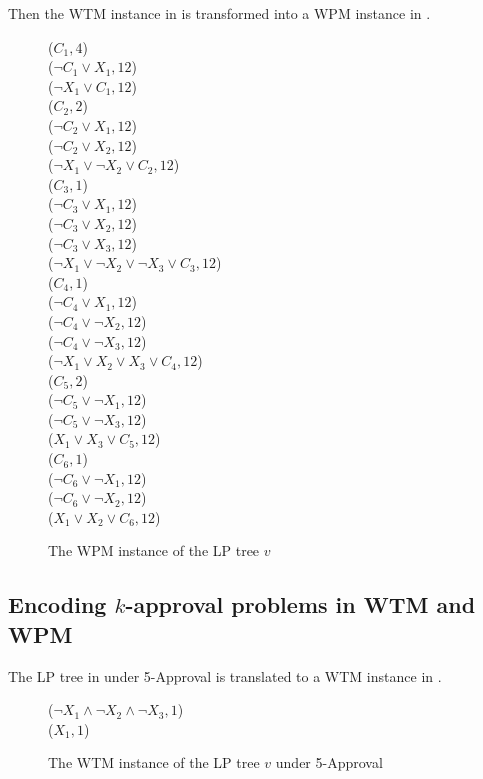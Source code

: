 Then the WTM instance in  is transformed into
a WPM instance in .
\begin{figure}[ht!]
   \small
	\begin{framed}
		($C_1,4$)\\
		($\neg C_1 \vee X_1, 12$)\\
		($\neg X_1 \vee C_1, 12$)\\
		($C_2, 2$)\\
		($\neg C_2 \vee X_1, 12$)\\
		($\neg C_2 \vee X_2, 12$)\\
		($\neg X_1 \vee \neg X_2 \vee C_2, 12$)\\
		($C_3, 1$)\\
		($\neg C_3 \vee X_1, 12$)\\
		($\neg C_3 \vee X_2, 12$)\\
		($\neg C_3 \vee X_3, 12$)\\
		($\neg X_1 \vee \neg X_2 \vee \neg X_3 \vee C_3, 12$)\\
		($C_4, 1$)\\
		($\neg C_4 \vee X_1, 12$)\\
		($\neg C_4 \vee \neg X_2, 12$)\\
		($\neg C_4 \vee \neg X_3, 12$)\\
		($\neg X_1 \vee X_2 \vee X_3 \vee C_4, 12$)\\
		($C_5, 2$)\\
		($\neg C_5 \vee \neg X_1, 12$)\\
		($\neg C_5 \vee \neg X_3, 12$)\\
		($X_1 \vee X_3 \vee C_5, 12$)\\
		($C_6, 1$)\\
		($\neg C_6 \vee \neg X_1, 12$)\\
		($\neg C_6 \vee \neg X_2, 12$)\\
		($X_1 \vee X_2 \vee C_6, 12$)
	\end{framed}
	\caption{The WPM instance of the LP tree $v$}
  \label{fig:borda_wpm}
\end{figure}




\subsection{Encoding $k$-approval problems in WTM and WPM}
The LP tree in  under 5-Approval is translated to a WTM instance
in .
\begin{figure}[H]
   \small
	\begin{framed}
		($\neg X_1 \wedge \neg X_2 \wedge \neg X_3,1$)\\
		($X_1, 1$)
	\end{framed}
	\caption{The WTM instance of the LP tree $v$ under 5-Approval}
  \label{fig:app_wtm}
\end{figure}

